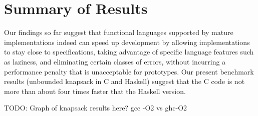 \section{Summary of Results}

Our findings so far suggest that functional languages supported by mature
implementations indeed can speed up development by allowing implementations to
stay close to specifications, taking advantage of specific language features
such as laziness, and eliminating certain classes of errors, without incurring
a performance penalty that is unacceptable for prototypes. Our present
benchmark results (unbounded knapsack in C and Haskell) suggest that the C
code is not more than about four times faster that the Haskell version.

TODO: Graph of knapsack results here? gcc -O2 vs ghc-O2
